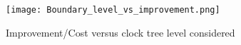 \begin{figure}
    \centering
    \texttt{[image: Boundary\_level\_vs\_improvement.png]} %
    \caption{Improvement/Cost versus clock tree level considered}
    \label{fig:boundary}
\end{figure}
